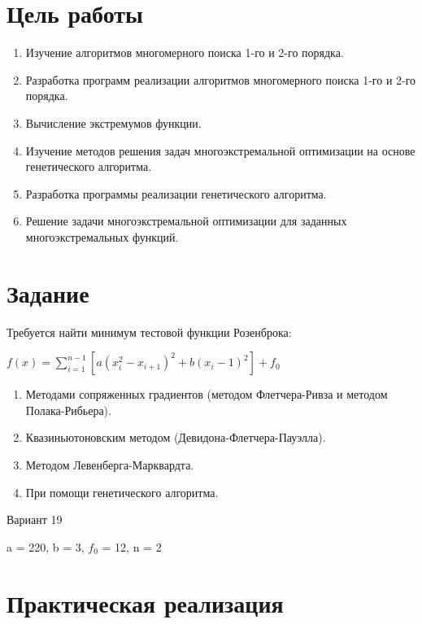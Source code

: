 \documentclass[a4paper, 14pt]{extarticle}
\begin{document}
\renewcommand{\ttdefault}{pcr}

\setlength{\tabcolsep}{3pt}
\newpage
\setcounter{page}{2}

\section{Цель работы}\label{Sect::goal}

\begin{enumerate}
    \item Изучение алгоритмов многомерного поиска 1-го и 2-го порядка.
    \item Разработка программ реализации алгоритмов многомерного поиска 1-го и 2-го порядка.
    \item Вычисление экстремумов функции.
    \item Изучение методов решения задач многоэкстремальной оптимизации на основе генетического алгоритма.
    \item Разработка программы реализации генетического алгоритма.
    \item Решение задачи многоэкстремальной оптимизации для заданных многоэкстремальных функций.
\end{enumerate}

\section{Задание}\label{Sect::task}

Требуется найти минимум тестовой функции Розенброка:

$f(x) = \sum_{i = 1}^{n - 1}[a(x_{i}^2 - x_{i + 1})^2 + b(x_i - 1)^2] + f_0$

\begin{enumerate}
    \item Методами сопряженных градиентов (методом Флетчера-Ривза и методом Полака-Рибьера).
    \item Квазиньютоновским методом (Девидона-Флетчера-Пауэлла).
    \item Методом Левенберга-Марквардта.
    \item При помощи генетического алгоритма.
\end{enumerate}

Вариант 19

a = 220, b = 3, $f_0$ = 12, n = 2

\section{Практическая реализация}\label{Sect::code}
\end{document}
